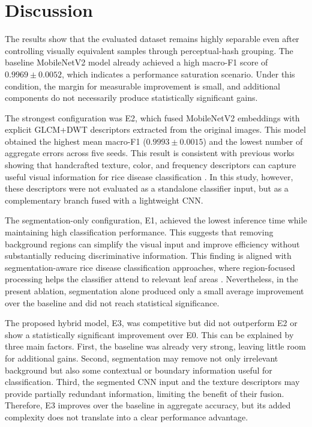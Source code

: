 \section{Discussion}

The results show that the evaluated dataset remains highly separable even after controlling visually equivalent samples through perceptual-hash grouping. The baseline MobileNetV2 model already achieved a high macro-F1 score of $0.9969 \pm 0.0052$, which indicates a performance saturation scenario. Under this condition, the margin for measurable improvement is small, and additional components do not necessarily produce statistically significant gains.

The strongest configuration was E2, which fused MobileNetV2 embeddings with explicit GLCM+DWT descriptors extracted from the original images. This model obtained the highest mean macro-F1 ($0.9993 \pm 0.0015$) and the lowest number of aggregate errors across five seeds. This result is consistent with previous works showing that handcrafted texture, color, and frequency descriptors can capture useful visual information for rice disease classification \cite{sutikno2026glcm_lbp_color,prity2026ffnn}. In this study, however, these descriptors were not evaluated as a standalone classifier input, but as a complementary branch fused with a lightweight CNN.

The segmentation-only configuration, E1, achieved the lowest inference time while maintaining high classification performance. This suggests that removing background regions can simplify the visual input and improve efficiency without substantially reducing discriminative information. This finding is aligned with segmentation-aware rice disease classification approaches, where region-focused processing helps the classifier attend to relevant leaf areas \cite{shakeel2026contour}. Nevertheless, in the present ablation, segmentation alone produced only a small average improvement over the baseline and did not reach statistical significance.

The proposed hybrid model, E3, was competitive but did not outperform E2 or show a statistically significant improvement over E0. This can be explained by three main factors. First, the baseline was already very strong, leaving little room for additional gains. Second, segmentation may remove not only irrelevant background but also some contextual or boundary information useful for classification. Third, the segmented CNN input and the texture descriptors may provide partially redundant information, limiting the benefit of their fusion. Therefore, E3 improves over the baseline in aggregate accuracy, but its added complexity does not translate into a clear performance advantage.

